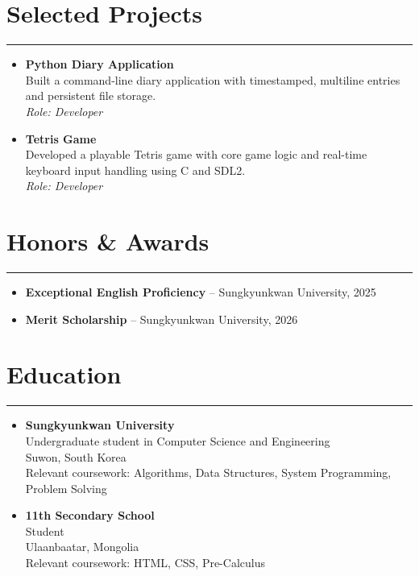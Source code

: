 \documentclass[letterpaper, 10pt]{article}
\begin{document}
\section*{Selected Projects}
\hrule
\vspace{4pt}
\begin{itemize}
    \item \textbf {Python Diary Application} \\
    Built a command-line diary application with timestamped, multiline entries and persistent file storage. \\
    \textit{Role: Developer}
\end{itemize}

\begin{itemize}
    \item \textbf {Tetris Game} \\
    Developed a playable Tetris game with core game logic and real-time keyboard input handling using C and SDL2. \\
    \textit{Role: Developer}
\end{itemize}

\section*{Honors \& Awards}
\hrule
\vspace{4pt}
\begin{itemize}
    \item \textbf {Exceptional English Proficiency} -- Sungkyunkwan University, 2025
    \item \textbf {Merit Scholarship} -- Sungkyunkwan University, 2026
\end{itemize}
\section*{Education}
\hrule
\vspace{4pt}
\begin{itemize}
    \item \textbf{Sungkyunkwan University} \\
    Undergraduate student in Computer Science and Engineering \\
    Suwon, South Korea \\
    Relevant coursework: Algorithms, Data Structures, System Programming, Problem Solving
    \item \textbf{11th Secondary School} \\
    Student \\
    Ulaanbaatar, Mongolia \\
    Relevant coursework: HTML, CSS, Pre-Calculus
\end{itemize}
\end{document}
